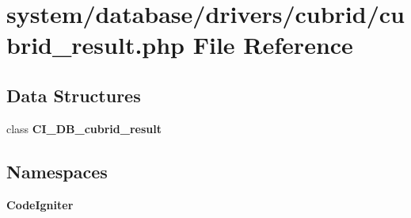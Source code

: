 \section{system/database/drivers/cubrid/cubrid\-\_\-result.php File Reference}
\label{cubrid__result_8php}
\subsection*{Data Structures}
\begin{DoxyCompactItemize}
\item 
class {\bf C\-I\-\_\-\-D\-B\-\_\-cubrid\-\_\-result}
\end{DoxyCompactItemize}
\subsection*{Namespaces}
\begin{DoxyCompactItemize}
\item 
{\bf Code\-Igniter}
\end{DoxyCompactItemize}
